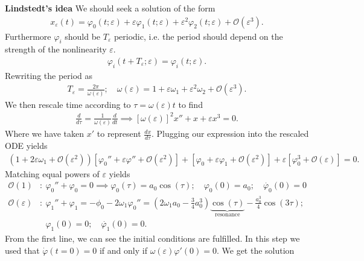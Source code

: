 \begin{ex}
\noindent
\textbf{Lindstedt's idea} We should seek a solution of the form
\begin{align}
	x_{\varepsilon}(t) = \varphi_0(t;\varepsilon) + \varepsilon \varphi_1 (t;\varepsilon) + \varepsilon^2 \varphi_2(t;\varepsilon) + \mathcal{O}(\varepsilon^3).
\end{align}
Furthermore $\varphi_i$ should be $T_\varepsilon$ periodic, i.e. the period should depend on the strength of the  nonlinearity $\varepsilon$.
\begin{align}
	\varphi_i(t+T_\varepsilon; \varepsilon) = \varphi_i(t;\varepsilon).
\end{align}
Rewriting the period as
\begin{align}
	T_\varepsilon = \frac{2 \pi }{\omega(\varepsilon)}; \quad \omega(\varepsilon) = 1 + \varepsilon \omega_1 + \varepsilon^2 \omega_2 + \mathcal{O}(\varepsilon^3).
\end{align}
We then rescale time according to $\tau = \omega(\varepsilon) t$ to find
\begin{align}
	\frac{d}{d\tau} = \frac{1}{\omega(\varepsilon)} \frac{d}{dt} \implies 
	\boxed{[\omega(\varepsilon)]^2 x'' + x + \varepsilon x^3 = 0.}
\end{align}
Where we have taken $x'$ to represent $\frac{dx}{d\tau}$. Plugging our expression into the rescaled ODE yields
\begin{align}
	\left( 1 + 2 \varepsilon \omega_1 + \mathcal{O}(\varepsilon^2) \right) \left[ \varphi_0'' + \varepsilon \varphi'' + \mathcal{O}(\varepsilon^2) \right] + \left[ \varphi_0 + \varepsilon \varphi_1 + \mathcal{O}(\varepsilon^2) \right] + \varepsilon \left[\varphi_0^{3} + \mathcal{O}(\varepsilon) \right] = 0.
\end{align}
Matching equal powers of $\varepsilon$ yields
\begin{subequations}\begin{align}
	\mathcal{O}(1)&:\ \varphi_0'' + \varphi_0 = 0 \implies \varphi_0(\tau) = a_0 \cos(\tau);\quad \varphi_0(0)=a_0;\quad \dot{\varphi_0}(0) = 0 \\
	\mathcal{O}(\varepsilon)&:\ \varphi_1'' + \varphi_1 = - \phi_0 - 2\omega_1 \varphi_{0}'' = 
	\left(2 \omega_1 a_0 - \frac{3}{4}a_0^{3}\right) \underbrace{\cos (\tau)}_{ \textrm{resonance} } - \frac{a_0^{3}}{4} \cos(3 \tau); \\
			     &\phantom{:}\ \varphi_1(0)=0; \quad \dot{\varphi_1}(0) = 0. 
\end{align}\end{subequations}
From the first line, we can see the initial conditions are fulfilled. In this step we used that $\dot{\varphi}(t=0) = 0$ if and only if $\omega(\varepsilon)\varphi '(0) = 0$. We get the solution

\end{ex}
